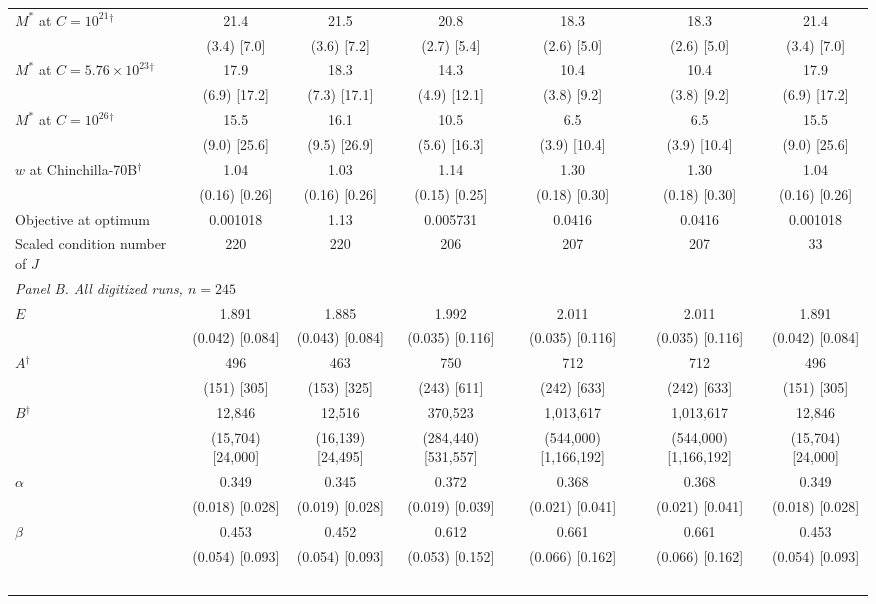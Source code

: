 \begin{table}[!htbp]
\begin{threeparttable}
\begin{tabular}{lcccccc}
$M^*$ at $C=10^{21}$$^\dagger$ & 21.4 & 21.5 & 20.8 & 18.3 & 18.3 & 21.4 \\
 & (3.4) [7.0] & (3.6) [7.2] & (2.7) [5.4] & (2.6) [5.0] & (2.6) [5.0] & (3.4) [7.0] \\
$M^*$ at $C=5.76\times10^{23}$$^\dagger$ & 17.9 & 18.3 & 14.3 & 10.4 & 10.4 & 17.9 \\
 & (6.9) [17.2] & (7.3) [17.1] & (4.9) [12.1] & (3.8) [9.2] & (3.8) [9.2] & (6.9) [17.2] \\
$M^*$ at $C=10^{26}$$^\dagger$ & 15.5 & 16.1 & 10.5 & 6.5 & 6.5 & 15.5 \\
 & (9.0) [25.6] & (9.5) [26.9] & (5.6) [16.3] & (3.9) [10.4] & (3.9) [10.4] & (9.0) [25.6] \\
$w$ at Chinchilla-70B$^\dagger$ & 1.04 & 1.03 & 1.14 & 1.30 & 1.30 & 1.04 \\
 & (0.16) [0.26] & (0.16) [0.26] & (0.15) [0.25] & (0.18) [0.30] & (0.18) [0.30] & (0.16) [0.26] \\
Objective at optimum & 0.001018 & 1.13 & 0.005731 & 0.0416 & 0.0416 & 0.001018 \\
Scaled condition number of $J$ & 220 & 220 & 206 & 207 & 207 & 33 \\
\midrule
\multicolumn{7}{l}{\textit{Panel B. All digitized runs, $n=245$}} \\
$E$ & 1.891 & 1.885 & 1.992 & 2.011 & 2.011 & 1.891 \\
 & (0.042) [0.084] & (0.043) [0.084] & (0.035) [0.116] & (0.035) [0.116] & (0.035) [0.116] & (0.042) [0.084] \\
$A$$^\dagger$ & 496 & 463 & 750 & 712 & 712 & 496 \\
 & (151) [305] & (153) [325] & (243) [611] & (242) [633] & (242) [633] & (151) [305] \\
$B$$^\dagger$ & 12{,}846 & 12{,}516 & 370{,}523 & 1{,}013{,}617 & 1{,}013{,}617 & 12{,}846 \\
 & (15{,}704) [24{,}000] & (16{,}139) [24{,}495] & (284{,}440) [531{,}557] & (544{,}000) [1{,}166{,}192] & (544{,}000) [1{,}166{,}192] & (15{,}704) [24{,}000] \\
$\alpha$ & 0.349 & 0.345 & 0.372 & 0.368 & 0.368 & 0.349 \\
 & (0.018) [0.028] & (0.019) [0.028] & (0.019) [0.039] & (0.021) [0.041] & (0.021) [0.041] & (0.018) [0.028] \\
$\beta$ & 0.453 & 0.452 & 0.612 & 0.661 & 0.661 & 0.453 \\
 & (0.054) [0.093] & (0.054) [0.093] & (0.053) [0.152] & (0.066) [0.162] & (0.066) [0.162] & (0.054) [0.093] \\
$$
\end{tabular}
\end{threeparttable}
\end{table}
